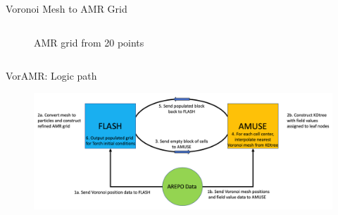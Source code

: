 \documentclass[aspectratio=169]{beamer}
\begin{document}
\begin{frame}{Voronoi Mesh to AMR Grid}
\begin{columns}
\begin{column}{0.37\textwidth}
\begin{figure}[h!]
                \caption{AMR grid from 20 points}
                \label{fig:amr_example}
            \end{figure}
        \end{column}
    \end{columns}
\end{frame} 
%
%
%
%
%
%
%
%
%
%
\begin{frame}{VorAMR: Logic path}
	\begin{figure}[h!]
                \centering
                \includegraphics[width=\linewidth]{../images/voramr_logic.png} \\
                \label{fig:voramr_logic}
	\end{figure}
\end{frame}
%
%
%
%
%
\end{document}
